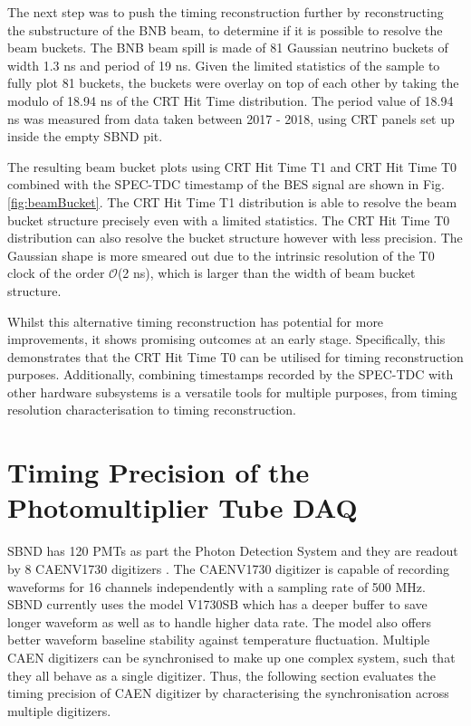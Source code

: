The next step was to push the timing reconstruction further by reconstructing the substructure of the BNB beam, to determine if it is possible to resolve the beam buckets.
The BNB beam spill is made of 81 Gaussian neutrino buckets of width 1.3 ns and period of 19 ns.
Given the limited statistics of the sample to fully plot 81 buckets, the buckets were overlay on top of each other by taking the modulo of 18.94 ns of the CRT Hit Time distribution.
The period value of 18.94 ns was measured from data taken between 2017 - 2018, using CRT panels set up inside the empty SBND pit.

The resulting beam bucket plots using CRT Hit Time T1 and CRT Hit Time T0 combined with the SPEC-TDC timestamp of the BES signal are shown in Fig. \ref{fig:beamBucket}.
The CRT Hit Time T1 distribution is able to resolve the beam bucket structure precisely even with a limited statistics.
The CRT Hit Time T0 distribution can also resolve the bucket structure however with less precision. 
The Gaussian shape is more smeared out due to the intrinsic resolution of the T0 clock of the order $\mathcal{O}$(2 ns), which is larger than the width of beam bucket structure.

Whilst this alternative timing reconstruction has potential for more improvements, it shows promising outcomes at an early stage.
Specifically, this demonstrates that the CRT Hit Time T0 can be utilised for timing reconstruction purposes. 
Additionally, combining timestamps recorded by the SPEC-TDC with other hardware subsystems is a versatile tools for multiple purposes, from timing resolution characterisation to timing reconstruction.

\section{Timing Precision of the Photomultiplier Tube DAQ}
\label{sec4PMT}

SBND has 120 PMTs as part the Photon Detection System and they are readout by 8 CAENV1730 digitizers \cite{caen_manuals}.
The CAENV1730 digitizer is capable of recording waveforms for 16 channels independently with a sampling rate of 500 MHz.
SBND currently uses the model V1730SB which has a deeper buffer to save longer waveform as well as to handle higher data rate.
The model also offers better waveform baseline stability against temperature fluctuation.
Multiple CAEN digitizers can be synchronised to make up one complex system, such that they all behave as a single digitizer.
Thus, the following section evaluates the timing precision of CAEN digitizer by characterising the synchronisation across multiple digitizers.

